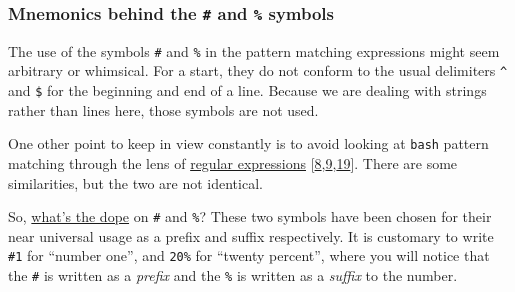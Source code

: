 \documentclass[
  a4paper,
]{article}
\newenvironment{Shaded}{\begin{snugshade}}{\end{snugshade}}
\newcommand{\BuiltInTok}[1]{\textcolor[rgb]{0.80,0.80,0.80}{#1}}
\newcommand{\CommentTok}[1]{\textcolor[rgb]{0.50,0.62,0.50}{#1}}
\newcommand{\NormalTok}[1]{\textcolor[rgb]{0.80,0.80,0.80}{#1}}
\newcommand{\OperatorTok}[1]{\textcolor[rgb]{0.94,0.94,0.82}{#1}}
\newcommand{\PreprocessorTok}[1]{\textcolor[rgb]{1.00,0.81,0.69}{\textbf{#1}}}
\newcommand{\StringTok}[1]{\textcolor[rgb]{0.80,0.58,0.58}{#1}}
\newcommand{\VariableTok}[1]{\textcolor[rgb]{0.80,0.80,0.80}{#1}}
\begin{document}
\begin{Shaded}
\end{Shaded}

\hypertarget{mnemonics-behind-the-and-symbols}{%
\subsubsection{\texorpdfstring{Mnemonics behind the \texttt{\#} and
\texttt{\%}
symbols}{Mnemonics behind the \# and \% symbols}}\label{mnemonics-behind-the-and-symbols}}

The use of the symbols \texttt{\#} and \texttt{\%} in the pattern
matching expressions might seem arbitrary or whimsical. For a start,
they do not conform to the usual delimiters \texttt{\^{}} and
\texttt{\$} for the beginning and end of a line. Because we are dealing
with strings rather than lines here, those symbols are not used.

One other point to keep in view constantly is to avoid looking at
\texttt{bash} pattern matching through the lens of
\href{https://www.regular-expressions.info/tutorial.html}{regular
expressions}
{[}\protect\hyperlink{ref-introbashregex}{8},\protect\hyperlink{ref-posixcharclass}{9},\protect\hyperlink{ref-writeregexp}{19}{]}.
There are some similarities, but the two are not identical.

So,
\href{https://www.ldoceonline.com/dictionary/the-dope-on-somebody-something}{what's
the dope} on \texttt{\#} and \texttt{\%}? These two symbols have been
chosen for their near universal usage as a prefix and suffix
respectively. It is customary to write \texttt{\#1} for ``number one'',
and \texttt{20\%} for ``twenty percent'', where you will notice that the
\texttt{\#} is written as a \emph{prefix} and the \texttt{\%} is written
as a \emph{suffix} to the number.
\end{document}
